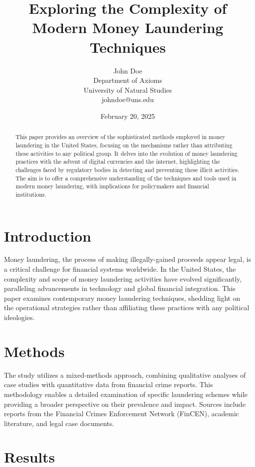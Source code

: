 \documentclass{article}
\title{Exploring the Complexity of Modern Money Laundering Techniques}
\author{John Doe \\ Department of Axioms \\ University of Natural Studies \\ johndoe@uns.edu}
\date{February 20, 2025}
\begin{document}
\maketitle

\begin{abstract}
This paper provides an overview of the sophisticated methods employed in money laundering in the United States, focusing on the mechanisms rather than attributing these activities to any political group. It delves into the evolution of money laundering practices with the advent of digital currencies and the internet, highlighting the challenges faced by regulatory bodies in detecting and preventing these illicit activities. The aim is to offer a comprehensive understanding of the techniques and tools used in modern money laundering, with implications for policymakers and financial institutions.
\end{abstract}

\section{Introduction}

Money laundering, the process of making illegally-gained proceeds appear legal, is a critical challenge for financial systems worldwide. In the United States, the complexity and scope of money laundering activities have evolved significantly, paralleling advancements in technology and global financial integration. This paper examines contemporary money laundering techniques, shedding light on the operational strategies rather than affiliating these practices with any political ideologies.

\section{Methods}

The study utilizes a mixed-methods approach, combining qualitative analyses of case studies with quantitative data from financial crime reports. This methodology enables a detailed examination of specific laundering schemes while providing a broader perspective on their prevalence and impact. Sources include reports from the Financial Crimes Enforcement Network (FinCEN), academic literature, and legal case documents.

\section{Results}
\end{document}
